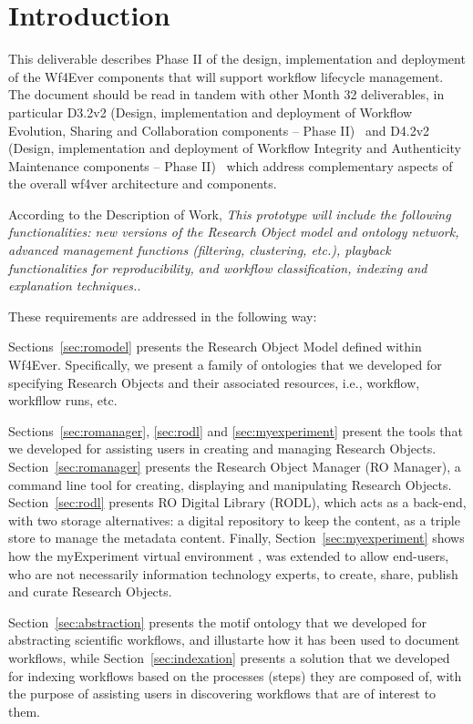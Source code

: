\section{Introduction}

This deliverable describes Phase II of the design, implementation and
deployment of the Wf4Ever components that will support workflow
lifecycle management. The document should be read in tandem with other
Month 32 deliverables, in particular D3.2v2 (Design, implementation
and deployment of Workflow Evolution, Sharing and Collaboration
components -- Phase II)~\cite{D3.2v2} and D4.2v2 (Design,
implementation and deployment of Workflow Integrity and Authenticity
Maintenance components -- Phase II)~\cite{D4.2v2} which address
complementary aspects of the overall wf4ver architecture and
components.

According to the Description of Work, \emph{This prototype will include the following functionalities: new versions of the Research Object model and ontology network, advanced management functions (filtering, clustering, etc.), playback functionalities for reproducibility, and workflow classification, indexing and explanation techniques.}. 

These requirements are addressed in the following way:

Sections~\ref{sec:romodel} presents the Research Object Model defined within Wf4Ever. Specifically, we present a family of ontologies that we developed for specifying Research Objects and their associated resources, i.e., workflow, workfllow runs, etc. 

Sections~\ref{sec:romanager}, \ref{sec:rodl} and \ref{sec:myexperiment} present the tools that we developed for assisting users in creating and managing Research Objects. Section~\ref{sec:romanager} presents the Research Object Manager (RO Manager), a command line tool for creating, displaying and manipulating Research Objects. Section~\ref{sec:rodl} presents RO Digital Library (RODL), which acts as a back-end, with two storage alternatives: a digital repository to keep the content, as a triple store to manage the metadata content. Finally, Section~\ref{sec:myexperiment} shows how the myExperiment virtual environment \cite{?}, was extended to allow end-users, who are not necessarily information technology experts, to create, share, publish and curate Research Objects.

Section~\ref{sec:abstraction} presents the motif ontology that we developed for abstracting scientific workflows, and illustarte how it has been used to document workflows, while Section~\ref{sec:indexation} presents a solution that we developed for indexing workflows based on the processes (steps) they are composed of, with the purpose of assisting users in discovering workflows that are of interest to them. 
